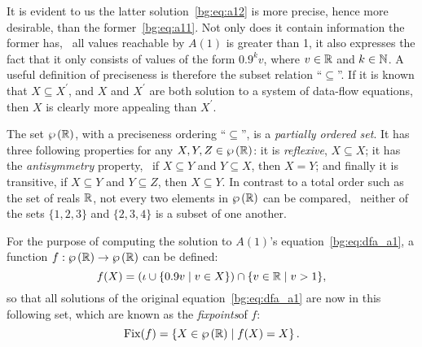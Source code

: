It is evident to us the latter solution~\eqref{bg:eq:a12} is more precise,
hence more desirable, than the former~\eqref{bg:eq:a11}.  Not only does it
contain information the former has, \ie~all values reachable by $A(1)$ is
greater than 1, it also expresses the fact that it only consists of values of
the form $0.9^k v$, where $v \in \mathbb{R}$ and $k \in \mathbb{N}$.  A useful
definition of preciseness is therefore the subset relation ``$\subseteq$''.
If it is known that $X \subseteq X^\prime$, and $X$ and $X^\prime$ are both
solution to a system of data-flow equations, then $X$ is clearly more appealing
than $X^\prime$.

The set $\wp\left({\mathbb{R}}\right)$, with a preciseness ordering ``$\subseteq$'',
is a \emph{partially ordered set}.  It has three following properties for any
$X, Y, Z \in \wp\left({\mathbb{R}}\right)$: it is \emph{reflexive}, $X \subseteq X$; it
has the \emph{antisymmetry} property, \ie~if $X \subseteq Y$ and $Y \subseteq
X$, then $X = Y$; and finally it is transitive, if $X \subseteq Y$ and $Y
\subseteq Z$, then $X \subseteq Y$.  In contrast to a total order such as the
set of reals $\mathbb{R}$, not every two elements in $\wp\left({\mathbb{R}}\right)$ can be
compared, \eg~neither of the sets $\{1, 2, 3\}$ and $\{2, 3, 4\}$ is a subset
of one another.

For the purpose of computing the solution to $A(1)$'s
equation~\eqref{bg:eq:dfa_a1}, a function $f: \wp\left({\mathbb{R}}\right) \to
\wp\left({\mathbb{R}}\right)$ can be defined:
\begin{equation}
    f(X) = \left(
        \iota \cup \left\{ 0.9 v \mid v \in X \right\}
    \right) \cap \{ v \in \mathbb{R} \mid v > 1 \},
    \label{bg:eq:a1_transfer}
\end{equation}
so that all solutions of the original equation~\eqref{bg:eq:dfa_a1} are now in
this following set, which are known as the \emph{fixpoints}\footnotemark[1] of
$f$:
\begin{equation}
    \mathrm{Fix}(f) = \left\{
        X \in \wp\left({\mathbb{R}}\right) \mid
        f(X) = X
    \right\}.
\end{equation}

